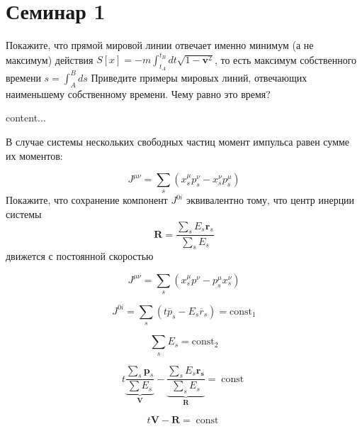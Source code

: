 
\section{Семинар 1}

\begin{problem}
	Покажите, что прямой мировой линии отвечает именно минимум (а не максимум) действия $S[x]=-m \int_{t_{A}}^{t_{B}} d t \sqrt{1-\boldsymbol{v}^{2}}$,
	то есть максимум собственного времени $s=\int_{A}^{B} d s$ Приведите примеры мировых линий, отвечающих
	наименьшему собственному времени. Чему равно это время?
\end{problem}	

\begin{solution}
	content...
\end{solution}




\begin{problem}
В случае системы нескольких свободных частиц момент импульса равен сумме их моментов:

$$
J^{\mu \nu}=\sum_{s}\left(x_{s}^{\mu} p_{s}^{\nu}-x_{s}^{\nu} p_{s}^{\mu}\right)
$$
Покажите, что сохранение компонент $ J^{0 i} $ 
эквивалентно тому, что центр инерции системы
$$
\boldsymbol{R}=\frac{\sum_{s} E_{s} \boldsymbol{r}_{s}}{\sum_{s} E_{s}}
$$
движется с постоянной скоростью
\end{problem}
\begin{solution}
	$$
	J^{\mu \nu}=\sum_{s}\left(x_{s}^{\mu} p^{\nu}-p_{s}^{\mu} x_{s}^{\nu}\right)
	$$
	
	$$
	J^{0 i}=\sum_{s}\left(t \overline{p}_{s}-E_{s} \overline{r}_{s}\right)=\operatorname{const_1}
	$$
	
	$$
	\sum_{s} E_{s}=\operatorname{const_2}
	$$
	
	$$
	t \underbrace{\frac{\sum_{s} \boldsymbol{p}_{s}}{\sum E_{s}}}_{\boldsymbol{V}}-\underbrace{\frac{\sum_{s} E_{s} \boldsymbol{r_{s}}}{\sum_s E_{s}}}_{\boldsymbol{R}}= \operatorname{const}
	$$
	
	
	$$
	t \boldsymbol{V}-\boldsymbol{R}=\operatorname{const}
	$$
	
\end{solution}











	